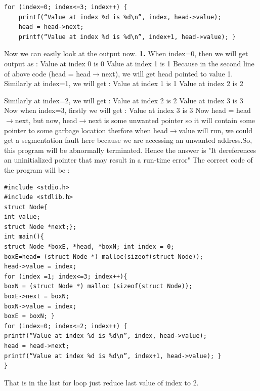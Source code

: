 \documentclass[journal,12pt,twocolumn]{IEEEtran}
\begin{document}
\begin{lstlisting}
for (index=0; index<=3; index++) {
	printf(“Value at index %d is %d\n”, index, head->value);
	head = head->next;
	printf(“Value at index %d is %d\n”, index+1, head->value); }
\end{lstlisting}
Now we can easily look at the output now. 
\textbf{1.}
\newline
When index=0, then we will get output as :
\newline
Value at index 0 is 0
\newline 
Value at index 1 is 1 
\newline
Because in the second line of above code (head = head$\rightarrow$next), we will get head pointed to value 1.
\newline
\newline
Similarly at index=1, we will get :
\newline
Value at index 1 is 1
\newline 
Value at index 2 is 2 
\newline
\newline

Similarly at index=2, we will get :
\newline
Value at index 2 is 2
\newline 
Value at index 3 is 3 
\newline
\newline
Now when index=3, firstly we will get :
\newline
Value at index 3 is 3 
\newline
Now head = head$\rightarrow$next, but now, head$\rightarrow$next is some unwanted pointer so it will contain some pointer to some garbage location therfore when head$\rightarrow$value will run, we could get a segmentation fault here because we are accessing an unwanted address.So, this program will be abnormally terminated.
\newline
Hence the answer is "It dereferences an uninitialized pointer that may result in a run-time error"
\newline
\newline
The correct code of the program will be :
\begin{lstlisting}
#include <stdio.h>
#include <stdlib.h>
struct Node{
int value;
struct Node *next;};
int main(){
struct Node *boxE, *head, *boxN; int index = 0;
boxE=head= (struct Node *) malloc(sizeof(struct Node));
head->value = index;
for (index =1; index<=3; index++){
boxN = (struct Node *) malloc (sizeof(struct Node));
boxE->next = boxN;
boxN->value = index;
boxE = boxN; }
for (index=0; index<=2; index++) {
printf(“Value at index %d is %d\n”, index, head->value);
head = head->next;
printf(“Value at index %d is %d\n”, index+1, head->value); }
}

\end{lstlisting}
That is in the last for loop just reduce last value of index to 2.
\end{document}
